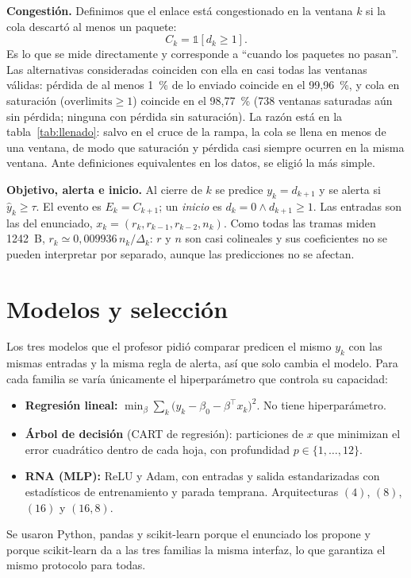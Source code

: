 \documentclass[11pt,a4paper]{article}
\newcommand{\ind}{\mathbb{1}}
\begin{document}
\textbf{Congestión.} Definimos que el enlace está congestionado en la ventana $k$ si la cola
descartó al menos un paquete:
\[
C_k=\ind[d_k\ge1].
\]
Es lo que se mide directamente y corresponde a ``cuando los paquetes no pasan''. Las
alternativas consideradas coinciden con ella en casi todas las ventanas válidas: pérdida
de al menos 1~\% de lo enviado coincide en el 99,96~\%, y cola en saturación
($\text{overlimits}\ge1$) coincide en el 98,77~\% (738 ventanas saturadas aún sin pérdida;
ninguna con pérdida sin saturación). La razón está en la tabla~\ref{tab:llenado}: salvo
en el cruce de la rampa, la cola se llena en menos de una ventana, de modo que saturación
y pérdida casi siempre ocurren en la misma ventana. Ante definiciones equivalentes en los
datos, se eligió la más simple.

\textbf{Objetivo, alerta e inicio.} Al cierre de $k$ se predice $y_k=d_{k+1}$ y se alerta si
$\hat y_k\ge\tau$. El evento es $E_k=C_{k+1}$; un \emph{inicio} es $d_k=0\wedge d_{k+1}\ge1$.
Las entradas son las del enunciado, $x_k=(r_k,r_{k-1},r_{k-2},n_k)$. Como todas las tramas
miden 1242~B, $r_k\simeq0{,}009936\,n_k/\Delta_k$: $r$ y $n$ son casi colineales y sus
coeficientes no se pueden interpretar por separado, aunque las predicciones no se
afectan.

\section{Modelos y selección}

Los tres modelos que el profesor pidió comparar predicen el mismo $y_k$ con las mismas
entradas y la misma regla de alerta, así que solo cambia el modelo. Para cada familia se
varía únicamente el hiperparámetro que controla su capacidad:
\begin{itemize}\itemsep0.2em
\item \textbf{Regresión lineal:} $\min_{\beta}\sum_k\bigl(y_k-\beta_0-\beta^{\top}x_k\bigr)^2$. No tiene hiperparámetro.
\item \textbf{Árbol de decisión} (CART de regresión): particiones de $x$ que minimizan el error cuadrático dentro de cada hoja, con profundidad $p\in\{1,\dots,12\}$.
\item \textbf{RNA (MLP):} ReLU y Adam, con entradas y salida estandarizadas con estadísticos de entrenamiento y parada temprana. Arquitecturas $(4)$, $(8)$, $(16)$ y $(16,8)$.
\end{itemize}
Se usaron Python, pandas y scikit-learn porque el enunciado los propone y porque
scikit-learn da a las tres familias la misma interfaz, lo que garantiza el mismo
protocolo para todas.
\end{document}

